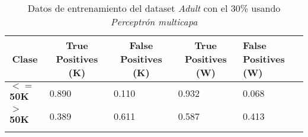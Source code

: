 \documentclass[10pt,a4paper]{article}
\begin{document}
\begin{table}[h]
\begin{tabular}{lllll}
\hline
\multicolumn{1}{|c|}{\textbf{Clase}} & \multicolumn{1}{c|}{\textbf{True Positives (K)}} & \multicolumn{1}{c|}{\textbf{False Positives (K)}} & \multicolumn{1}{c|}{\textbf{True Positives (W)}} & \multicolumn{1}{l|}{\textbf{False Positives (W)}} \\ \hline
\multicolumn{1}{|l|}{\textbf{$<=$50K}} & \multicolumn{1}{l|}{0.890}          & \multicolumn{1}{l|}{0.110}          & \multicolumn{1}{l|}{0.932}          & \multicolumn{1}{l|}{0.068} \\ \hline
\multicolumn{1}{|l|}{\textbf{$>$50K}} & \multicolumn{1}{l|}{0.389}          & \multicolumn{1}{l|}{0.611}          & \multicolumn{1}{l|}{0.587}          & \multicolumn{1}{l|}{0.413} \\ \hline
\textbf{}                       &                                &                                &                                &                      
\end{tabular}
\caption{Datos de entrenamiento del dataset \emph{Adult} con el 30\% usando \emph{Perceptrón multicapa}}
\label{tab:adult_perceptron_30}
\end{table}
\end{document}
